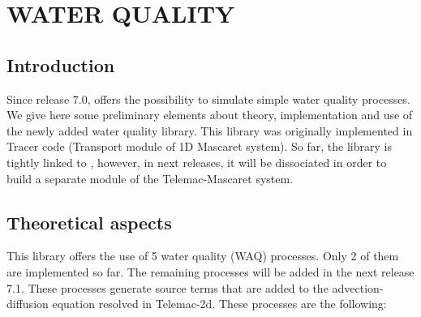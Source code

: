 \chapter{WATER QUALITY}
\label{ch:wat:qual}

\section{  Introduction}

 Since release 7.0,  offers the possibility to simulate simple water quality processes. We give here some preliminary elements about theory, implementation and use of the newly added water quality library. This library was originally implemented in Tracer code (Transport module of 1D Mascaret system).  So far, the library is tightly linked to , however, in next releases, it will be dissociated in order to build a separate module of the Telemac-Mascaret system.


\section{ Theoretical aspects}

 This library offers the use of 5 water quality (WAQ) processes. Only 2 of them are implemented so far. The remaining processes will be added in the next release 7.1. These processes generate source terms that are added to the advection-diffusion equation resolved in Telemac-2d. These processes are the following:

